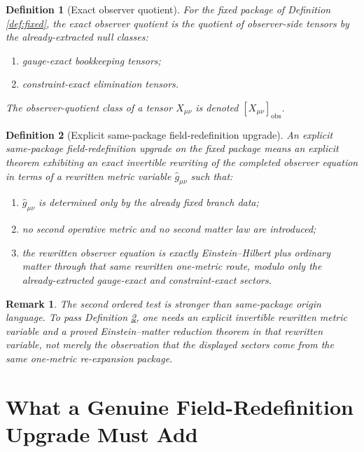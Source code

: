 \documentclass[11pt]{article}
\newcommand{\RedefMetric}{\widehat g}
\newcommand{\ObserverClass}[1]{\left[#1\right]_{\mathrm{obs}}}
\newtheorem{definition}{Definition}
\newtheorem{remark}{Remark}
\begin{document}
\begin{definition}[Exact observer quotient]
\label{def:quot}
For the fixed package of Definition \ref{def:fixed}, the \emph{exact observer quotient} is the quotient of observer-side tensors by the already-extracted null classes:
\begin{enumerate}
    \item gauge-exact bookkeeping tensors;
    \item constraint-exact elimination tensors.
\end{enumerate}
The observer-quotient class of a tensor \(X_{\mu\nu}\) is denoted \(\ObserverClass{X_{\mu\nu}}\).
\end{definition}

\begin{definition}[Explicit same-package field-redefinition upgrade]
\label{def:redef}
An \emph{explicit same-package field-redefinition upgrade} on the fixed package means an explicit theorem exhibiting an exact invertible rewriting of the completed observer equation in terms of a rewritten metric variable \(\RedefMetric_{\mu\nu}\) such that:
\begin{enumerate}
    \item \(\RedefMetric_{\mu\nu}\) is determined only by the already fixed branch data;
    \item no second operative metric and no second matter law are introduced;
    \item the rewritten observer equation is exactly Einstein--Hilbert plus ordinary matter through that same rewritten one-metric route, modulo only the already-extracted gauge-exact and constraint-exact sectors.
\end{enumerate}
\end{definition}

\begin{remark}
The second ordered test is stronger than same-package origin language. To pass Definition \ref{def:redef}, one needs an explicit invertible rewritten metric variable and a proved Einstein--matter reduction theorem in that rewritten variable, not merely the observation that the displayed sectors come from the same one-metric re-expansion package.
\end{remark}

\section{What a Genuine Field-Redefinition Upgrade Must Add}
\end{document}
